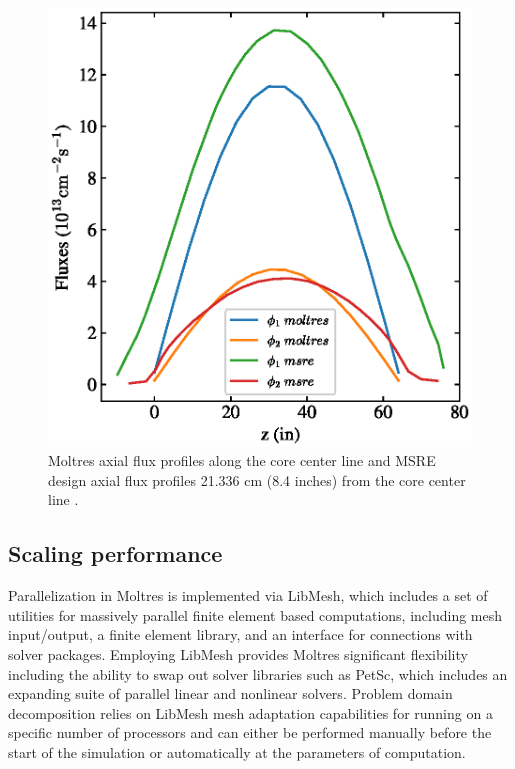 \documentclass{article}
\makeatletter
\let\Oldsubsection\subsection
\renewcommand{\subsection}{\FloatBarrier\Oldsubsection}
\def\maxwidth#1{\ifdim\Gin@nat@width>#1 #1\else\Gin@nat@width\fi}
\makeatother
\begin{document}
\begin{figure}[htpb]
    \centering
    \includegraphics[width=\maxwidth{\textwidth}]{combined_msre_moltres_axial.eps}
    \caption{Moltres axial flux profiles along the core center line and \gls{MSRE}
    design axial flux profiles 21.336 cm (8.4 inches) from the core center line \cite[p. 91]{briggs_molten-salt_1964}.}
    \label{fig:axial_fluxes_compare}
\end{figure}

\subsection{Scaling performance}

Parallelization in Moltres is implemented via LibMesh, which includes a set of
utilities for massively parallel finite element based computations, including
mesh input/output, a finite element library, and an interface for connections with
solver packages. Employing LibMesh provides Moltres
significant flexibility including the ability to swap out solver libraries
such as PetSc, which includes an expanding suite of parallel linear and
nonlinear solvers. Problem domain decomposition relies on LibMesh mesh
adaptation capabilities for running on a specific number of processors and
can either be performed manually before the start of the simulation or
automatically at the parameters of computation. 
\end{document}
